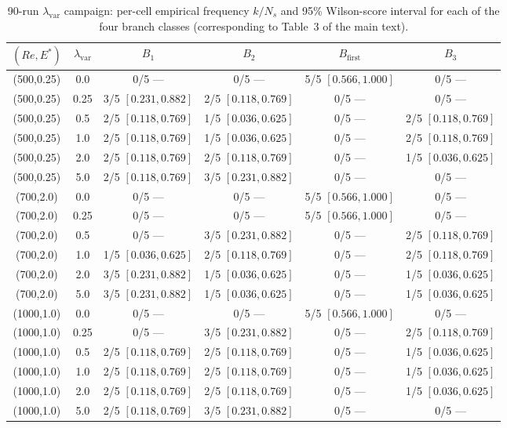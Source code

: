 \documentclass[11pt]{article}
\begin{document}
\begin{table}[h]
\centering\small
\caption{90-run $\lambda_{\mathrm{var}}$ campaign: per-cell empirical frequency
$k/N_s$ and 95\% Wilson-score interval for each of the four branch classes
(corresponding to Table~3 of the main text).}
\label{tab:S4a}
\begin{tabular}{cccccc}
\toprule
$(Re,E^*)$ & $\lambda_{\mathrm{var}}$ & $B_1$ & $B_2$ & $B_{\mathrm{first}}$ & $B_3$\\
\midrule
(500,0.25) & 0.0  & 0/5 --- & 0/5 --- & 5/5 $[0.566,1.000]$ & 0/5 ---\\
(500,0.25) & 0.25 & 3/5 $[0.231,0.882]$ & 2/5 $[0.118,0.769]$ & 0/5 --- & 0/5 ---\\
(500,0.25) & 0.5  & 2/5 $[0.118,0.769]$ & 1/5 $[0.036,0.625]$ & 0/5 --- & 2/5 $[0.118,0.769]$\\
(500,0.25) & 1.0  & 2/5 $[0.118,0.769]$ & 1/5 $[0.036,0.625]$ & 0/5 --- & 2/5 $[0.118,0.769]$\\
(500,0.25) & 2.0  & 2/5 $[0.118,0.769]$ & 2/5 $[0.118,0.769]$ & 0/5 --- & 1/5 $[0.036,0.625]$\\
(500,0.25) & 5.0  & 2/5 $[0.118,0.769]$ & 3/5 $[0.231,0.882]$ & 0/5 --- & 0/5 ---\\
\addlinespace
(700,2.0)  & 0.0  & 0/5 --- & 0/5 --- & 5/5 $[0.566,1.000]$ & 0/5 ---\\
(700,2.0)  & 0.25 & 0/5 --- & 0/5 --- & 5/5 $[0.566,1.000]$ & 0/5 ---\\
(700,2.0)  & 0.5  & 0/5 --- & 3/5 $[0.231,0.882]$ & 0/5 --- & 2/5 $[0.118,0.769]$\\
(700,2.0)  & 1.0  & 1/5 $[0.036,0.625]$ & 2/5 $[0.118,0.769]$ & 0/5 --- & 2/5 $[0.118,0.769]$\\
(700,2.0)  & 2.0  & 3/5 $[0.231,0.882]$ & 1/5 $[0.036,0.625]$ & 0/5 --- & 1/5 $[0.036,0.625]$\\
(700,2.0)  & 5.0  & 3/5 $[0.231,0.882]$ & 1/5 $[0.036,0.625]$ & 0/5 --- & 1/5 $[0.036,0.625]$\\
\addlinespace
(1000,1.0) & 0.0  & 0/5 --- & 0/5 --- & 5/5 $[0.566,1.000]$ & 0/5 ---\\
(1000,1.0) & 0.25 & 0/5 --- & 3/5 $[0.231,0.882]$ & 0/5 --- & 2/5 $[0.118,0.769]$\\
(1000,1.0) & 0.5  & 2/5 $[0.118,0.769]$ & 2/5 $[0.118,0.769]$ & 0/5 --- & 1/5 $[0.036,0.625]$\\
(1000,1.0) & 1.0  & 2/5 $[0.118,0.769]$ & 2/5 $[0.118,0.769]$ & 0/5 --- & 1/5 $[0.036,0.625]$\\
(1000,1.0) & 2.0  & 2/5 $[0.118,0.769]$ & 2/5 $[0.118,0.769]$ & 0/5 --- & 1/5 $[0.036,0.625]$\\
(1000,1.0) & 5.0  & 2/5 $[0.118,0.769]$ & 3/5 $[0.231,0.882]$ & 0/5 --- & 0/5 ---\\
\bottomrule
\end{tabular}
\end{table}
\end{document}
